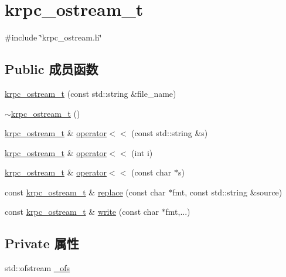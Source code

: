 \hypertarget{classkrpc__ostream__t}{}\section{krpc\+\_\+ostream\+\_\+t}
\label{classkrpc__ostream__t}


{\ttfamily \#include \char`\"{}krpc\+\_\+ostream.\+h\char`\"{}}

\subsection*{Public 成员函数}
\begin{DoxyCompactItemize}
\item 
\hyperlink{classkrpc__ostream__t_a99ff11513bcf1485bd273d53806f5ff3}{krpc\+\_\+ostream\+\_\+t} (const std\+::string \&file\+\_\+name)
\item 
\hyperlink{classkrpc__ostream__t_a470d8b5ee5b1275e85c8b03963dcfd52}{$\sim$krpc\+\_\+ostream\+\_\+t} ()
\item 
\hyperlink{classkrpc__ostream__t}{krpc\+\_\+ostream\+\_\+t} \& \hyperlink{classkrpc__ostream__t_a35e369579c46db153c43dc57e99dcac7}{operator$<$$<$} (const std\+::string \&s)
\item 
\hyperlink{classkrpc__ostream__t}{krpc\+\_\+ostream\+\_\+t} \& \hyperlink{classkrpc__ostream__t_ae17660cbff58023e499bfd66fb42f23a}{operator$<$$<$} (int i)
\item 
\hyperlink{classkrpc__ostream__t}{krpc\+\_\+ostream\+\_\+t} \& \hyperlink{classkrpc__ostream__t_af4b4d141b93f2b502c4b2b4568ae36d0}{operator$<$$<$} (const char $\ast$s)
\item 
const \hyperlink{classkrpc__ostream__t}{krpc\+\_\+ostream\+\_\+t} \& \hyperlink{classkrpc__ostream__t_a57ab03d1ea3f106c63c60d6ffcc2f291}{replace} (const char $\ast$fmt, const std\+::string \&source)
\item 
const \hyperlink{classkrpc__ostream__t}{krpc\+\_\+ostream\+\_\+t} \& \hyperlink{classkrpc__ostream__t_a05f527c02f9e1856aa9101d09fdfcf15}{write} (const char $\ast$fmt,...)
\end{DoxyCompactItemize}
\subsection*{Private 属性}
\begin{DoxyCompactItemize}
\item 
std\+::ofstream \hyperlink{classkrpc__ostream__t_a916a42aaa2e3915ad854b406e27a51bb}{\+\_\+ofs}
\end{DoxyCompactItemize}


